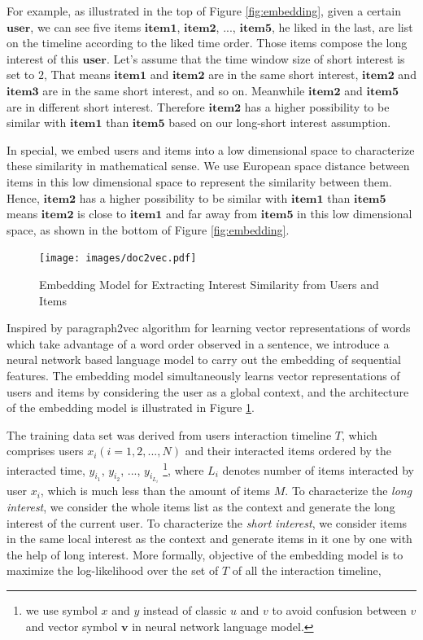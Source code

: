 \documentclass{sig-alternate-05-2015}
\begin{document}
For example, as illustrated in the top of Figure \ref{fig:embedding},
given a certain $\mathbf{user}$, we can see five items
$\mathbf{item1}$, $\mathbf{item2}$, ..., $\mathbf{item5}$, he liked in the last,
are list on the timeline according to the liked time order.
Those items compose the long interest of this $\mathbf{user}$.
Let's assume that the time window size of short interest is set to $2$,
That means $\mathbf{item1}$ and $\mathbf{item2}$ are in the same short interest,
$\mathbf{item2}$ and $\mathbf{item3}$ are in the same short interest, and so on.
Meanwhile $\mathbf{item2}$ and $\mathbf{item5}$ are in different short interest.
Therefore $\mathbf{item2}$ has a higher possibility to be similar with $\mathbf{item1}$
than $\mathbf{item5}$ based on our long-short interest assumption.

In special, we embed users and items into a low dimensional space
to characterize these similarity in mathematical sense.
We use European space distance between items in this low dimensional space
to represent the similarity between them.
Hence, $\mathbf{item2}$ has a higher possibility to be similar with $\mathbf{item1}$
than $\mathbf{item5}$ means $\mathbf{item2}$ is close to $\mathbf{item1}$ and far away from $\mathbf{item5}$
in this low dimensional space, as shown in the bottom of Figure \ref{fig:embedding}.

\begin{figure}[htbp]
	\centering
	\texttt{[image: images/doc2vec.pdf]}
	\caption{Embedding Model for Extracting Interest Similarity from Users and Items}
	\label{fig:doc2vec}
\end{figure}

Inspired by paragraph2vec algorithm \cite{le2014distributed} for learning
vector representations of words which take advantage of a word order observed in a sentence,
we introduce a neural network based language model to carry out the embedding of sequential features.
The embedding model simultaneously learns vector representations of users and items
by considering the user as a global context,
and the architecture of the embedding model is illustrated in Figure \ref{fig:doc2vec}.

The training data set was derived from users interaction timeline $T$,
which comprises users $x_i (i=1,2,...,N)$ and their interacted items ordered by the interacted time,
$y_{i_1}$, $y_{i_2}$, ..., $y_{i_{L_i}}$
\footnote{we use symbol $x$ and $y$ instead of classic $u$ and $v$ to avoid confusion between $v$
and vector symbol $\mathbf{v}$ in neural network language model.},
where $L_i$ denotes number of items interacted by user $x_i$,
which is much less than the amount of items $M$.
To characterize the \emph{long interest}, we consider the whole items list as the context and generate
the long interest of the current user.
To characterize the \emph{short interest}, we consider items in the same local interest as the context
and generate items in it one by one with the help of long interest.
More formally, objective of the embedding model is to
maximize the log-likelihood over the set of $T$ of all the interaction timeline,
\end{document}
